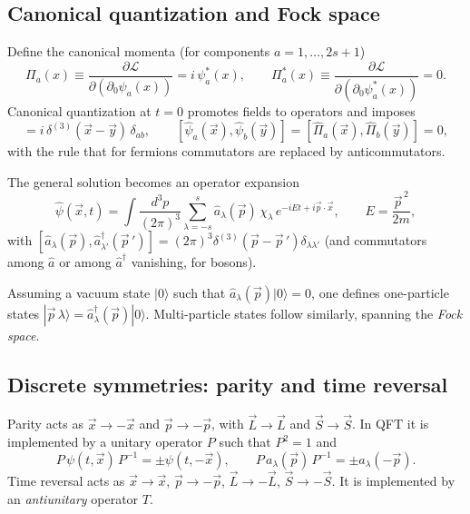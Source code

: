 \subsection{Canonical quantization and Fock space}
Define the canonical momenta (for components $a=1,\dots,2s+1$)
\begin{equation}
\Pi_a(x)\equiv \frac{\partial\mathcal L}{\partial(\partial_0\psi_a(x))}= i\,\psi_a^\ast(x),
\qquad
\Pi_a^\ast(x)\equiv \frac{\partial\mathcal L}{\partial(\partial_0\psi_a^\ast(x))}=0.
\end{equation}
Canonical quantization at $t=0$ promotes fields to operators and imposes
\begin{equation}
[\hat\psi_a(\vec x),\hat\Pi_b(\vec y)]= i\,\delta^{(3)}(\vec x-\vec y)\,\delta_{ab},
\qquad
[\hat\psi_a(\vec x),\hat\psi_b(\vec y)]=[\hat\Pi_a(\vec x),\hat\Pi_b(\vec y)]=0,
\end{equation}
with the rule that for fermions commutators are replaced by anticommutators.

The general solution becomes an operator expansion
\begin{equation}
\hat\psi(\vec x,t)=\int\frac{d^3p}{(2\pi)^3}\sum_{\lambda=-s}^{s}
\hat a_\lambda(\vec p)\,\chi_\lambda\,e^{-iEt+i\vec p\cdot\vec x},\qquad
E=\frac{\vec p^{\,2}}{2m},
\end{equation}
with $[\hat a_\lambda(\vec p),\hat a^\dagger_{\lambda'}(\vec p\,')]=(2\pi)^3\delta^{(3)}(\vec p-\vec p\,')\delta_{\lambda\lambda'}$
(and commutators among $\hat a$ or among $\hat a^\dagger$ vanishing, for bosons).

Assuming a vacuum state $|0\rangle$ such that $\hat a_\lambda(\vec p)|0\rangle=0$, one defines
one-particle states $|\vec p\,\lambda\rangle=\hat a^\dagger_\lambda(\vec p)|0\rangle$.
Multi-particle states follow similarly, spanning the \emph{Fock space}.

\subsection{Discrete symmetries: parity and time reversal}
Parity acts as $\vec x\to -\vec x$ and $\vec p\to -\vec p$, with $\vec L\to \vec L$ and $\vec S\to \vec S$.
In QFT it is implemented by a unitary operator $P$ such that $P^2=1$ and
\begin{equation}
P\,\psi(t,\vec x)\,P^{-1}=\pm \psi(t,-\vec x),
\qquad
P\,a_\lambda(\vec p)\,P^{-1}=\pm a_\lambda(-\vec p).
\end{equation}
Time reversal acts as $\vec x\to \vec x$, $\vec p\to -\vec p$, $\vec L\to -\vec L$, $\vec S\to -\vec S$.
It is implemented by an \emph{antiunitary} operator $T$.

